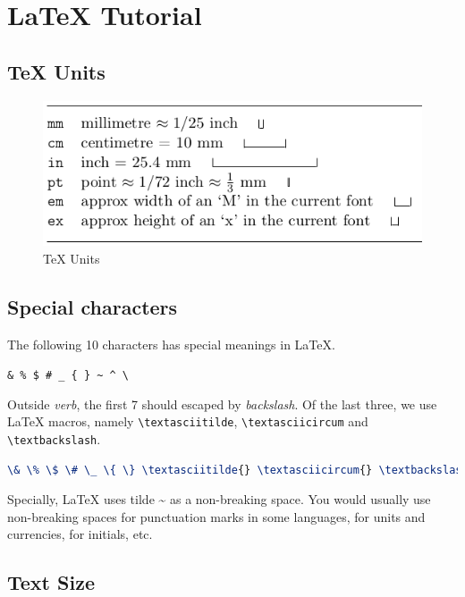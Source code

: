 \chapter{\LaTeX{} Tutorial}
\label{cha:latex-tutorial}

\section{\TeX{} Units}
\label{sec:tex-units}

\begin{figure}[h]
  \centering
  \includegraphics[width=.5\textwidth]{units}
  \caption{\TeX{} Units}
  \label{fig:tex-units}
\end{figure}

\section{Special characters}
\label{sec:special-characters}

The following 10 characters has special meanings in
\LaTeX{}.

\begin{center}
  \verb|& % $ # _ { } ~ ^ \|
\end{center}

Outside \textit{verb}, the first 7 should escaped by
\textit{backslash}. Of the last three, we use \LaTeX{} macros,
namely \verb|\textasciitilde|, \verb|\textasciicircum| and
\verb|\textbackslash|.

\begin{lstlisting}[language=TeX,caption={Special Characters},label={lst:special-characters}]
\& \% \$ \# \_ \{ \} \textasciitilde{} \textasciicircum{} \textbackslash{}
\end{lstlisting}

Specially, \LaTeX{} uses tilde \textasciitilde{} as a non-breaking space. You
would usually use non-breaking spaces for punctuation marks in
some languages, for units and currencies, for initials, etc.

\section{Text Size}
\label{sec:latex-text-size}

